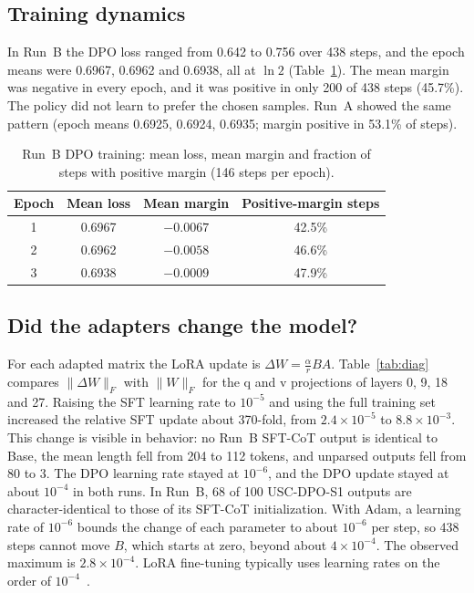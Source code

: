 \documentclass[11pt, a4paper]{article}
\newcommand{\soldpo}{USC-DPO-S1}
\begin{document}
\subsection{Training dynamics}
In Run~B the DPO loss ranged from 0.642 to 0.756 over 438 steps, and the epoch means were 0.6967, 0.6962 and 0.6938, all at $\ln 2$ (Table~\ref{tab:train}). The mean margin was negative in every epoch, and it was positive in only 200 of 438 steps (45.7\%). The policy did not learn to prefer the chosen samples. Run~A showed the same pattern (epoch means 0.6925, 0.6924, 0.6935; margin positive in 53.1\% of steps).

\begin{table}[t]
\centering
\caption{Run~B DPO training: mean loss, mean margin and fraction of steps with positive margin (146 steps per epoch).}
\label{tab:train}
\small
\begin{tabular}{cccc}
\toprule
\textbf{Epoch} & \textbf{Mean loss} & \textbf{Mean margin} & \textbf{Positive-margin steps} \\
\midrule
1 & 0.6967 & $-0.0067$ & 42.5\% \\
2 & 0.6962 & $-0.0058$ & 46.6\% \\
3 & 0.6938 & $-0.0009$ & 47.9\% \\
\bottomrule
\end{tabular}
\end{table}

\subsection{Did the adapters change the model?}
For each adapted matrix the LoRA update is $\Delta W=\tfrac{\alpha}{r}BA$. Table~\ref{tab:diag} compares $\|\Delta W\|_F$ with $\|W\|_F$ for the q and v projections of layers 0, 9, 18 and 27. Raising the SFT learning rate to $10^{-5}$ and using the full training set increased the relative SFT update about 370-fold, from $2.4\times10^{-5}$ to $8.8\times10^{-3}$. This change is visible in behavior: no Run~B SFT-CoT output is identical to Base, the mean length fell from 204 to 112 tokens, and unparsed outputs fell from 80 to 3. The DPO learning rate stayed at $10^{-6}$, and the DPO update stayed at about $10^{-4}$ in both runs. In Run~B, 68 of 100 \soldpo{} outputs are character-identical to those of its SFT-CoT initialization. With Adam, a learning rate of $10^{-6}$ bounds the change of each parameter to about $10^{-6}$ per step, so 438 steps cannot move $B$, which starts at zero, beyond about $4\times10^{-4}$. The observed maximum is $2.8\times10^{-4}$. LoRA fine-tuning typically uses learning rates on the order of $10^{-4}$~\cite{dettmers2023qlora}.
\end{document}
